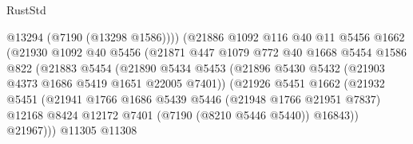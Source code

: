 \begin{lexlean}{RustStd}
\begin{coremodule}
                                      @13294
                                      (@7190 (@13298 @1586))))
                                  (@21886
                                    @1092
                                    @116
                                    @40
                                    @11
                                    @5456
                                    @1662
                                    (@21930
                                      @1092
                                      @40
                                      @5456
                                      (@21871
                                        @447
                                        @1079
                                        @772
                                        @40
                                        @1668
                                        @5454
                                        @1586
                                        @822
                                        (@21883
                                          @5454
                                          (@21890
                                            @5434
                                            @5453
                                            (@21896
                                              @5430
                                              @5432
                                              (@21903 @4373 @1686 @5419 @1651 @22005 @7401))
                                            (@21926
                                              @5451
                                              @1662
                                              (@21932
                                                @5451
                                                (@21941
                                                  @1766
                                                  @1686
                                                  @5439
                                                  @5446
                                                  (@21948 @1766 @21951 @7837)
                                                  @12168
                                                  @8424
                                                  @12172
                                                  @7401
                                                  (@7190 (@8210 @5446 @5440))
                                                  @16843))
                                              @21967)))
                                        @11305
                                        @11308

\end{coremodule}
\end{lexlean}

